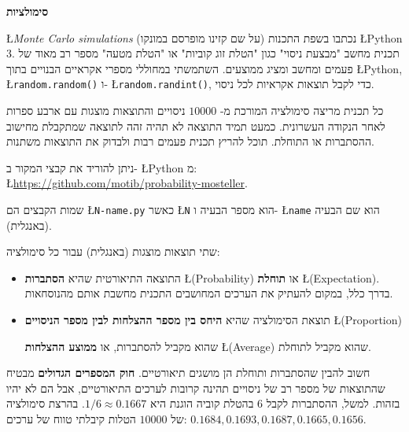 \textbf{סימולציות}

\L{\emph{Monte Carlo simulations}}
(על שם קזינו מופרסם במונקו) נכתבו בשפת התכנות
\L{Python 3}.
תכנית מחשב "מבצעת ניסוי" כגון "הטלת זוג קוביות" או "הטלת מטעה" מספר רב מאוד של פעמים ומחשב ומציג ממוצעים. השתמשתי במחוללי מספרי אקראיים הבנויים בתוך
\L{Python},
\L{\texttt{random.random()}}
ו-%
\L{\texttt{random.randint()}},
כדי לקבל תוצאות אקראיות לכל ניסוי.

כל תכנית מריצה סימולציה המורכת מ-%
$10000$
ניסויים והתוצאות מוצגות עם ארבע ספרות לאחר הנקודה העשרונית. כמעט תמיד התוצאה לא תהיה זהה לתוצאה שמתקבלת מחישוב ההסתברות או התוחלת. תוכל להריץ תכנית פעמים רבות ולבדוק את התוצאות משתנות.

ניתן להוריד את קבצי המקור ב-%
\L{Python}
מ:\\
\L{\url{https://github.com/motib/probability-mosteller}}.

שמות הקבצים הם 
\L{\texttt{N-name.py}}
כאשר
\L{\texttt{N}}
הוא מספר הבעיה ו-%
\L{\texttt{name}}
הוא שם הבעיה (באנגלית).

שתי תוצאות מוצגות (באנגלית) עבור כל סימולציה:
\begin{itemize}
\item
התוצאה התיאורטית שהיא 
\textbf{הסתברות}
\L{(Probability)}
או
\textbf{תוחלת}
\L{(Expectation)}.
בדרך כלל, במקום להעתיק את הערכים המחושבים התכנית מחשבת אותם מהנוסחאות.
\item
תוצאת הסימולציה שהיא
\textbf{היחס בין מספר ההצלחות לבין מספר הניסויים}
\L{(Proportion)}

שהוא מקביל להסתברות, או
\textbf{ממוצע ההצלחות}
\L{(Average)}
שהוא מקביל לתוחלת.
\end{itemize}
חשוב להבין שהסתברות ותוחלת הן מושגים תיאורטיים. 
\textbf{חוק המספרים הגדולים}
מבטיח שהתוצאות של מספר רב של ניסויים תהינה קרובות לערכים התיאורטיים, אבל הם לא יהיו בזהות. למשל, ההסתברות לקבל 
$6$
בהטלת קוביה הוגנת היא
$1/6\approx 0.1667$.
בהרצת סימולציה של 
$10000$
הטלות קיבלתי טווח של ערכים:
$0.1684, 0.1693, 0.1687, 0.1665, 0.1656$.

\newpage
